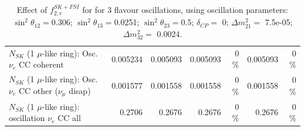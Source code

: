 \begin{table}
\begin{tabular}{| l | r | r | r  r | r  r |}
                          $N_{SK}$ (1 $\mu$-like ring): Osc. $\nu_e$ CC coherent &        0.005234 &        0.005093 &        0.005093 &        0 \%  &        0.005093 &        0 \%  \\ 
           $N_{SK}$ (1 $\mu$-like ring): Osc. $\nu_e$ CC other ($\nu_\mu$ disap) &        0.001577 &        0.001558 &        0.001558 &        0 \%  &        0.001558 &        0 \%  \\ 
                        $N_{SK}$ (1 $\mu$-like ring): oscillation $\nu_e$ CC all &          0.2706 &          0.2676 &          0.2676 &        0 \%  &          0.2676 &        0 \%  \\ 
\hline
\hline
\end{tabular}
\caption{ Effect of $f_{2; r}^{SK+FSI}$ for for 3 flavour oscillations, using oscillation parameters:  $\sin^2\theta_{12} = $0.306; $\sin^2\theta_{13} = $0.0251; $\sin^2\theta_{23} = $0.5; $\delta_{CP} = $        0; $\Delta m^2_{21} = $    7.5e-05; $\Delta m^2_{32} = $    0.0024. }
\label{tab:num_skdetfsi_002_1RmuT_3f_osc_t13:0.0251_spectralreco_spectraltrue}
\end{table}
\clearpage

